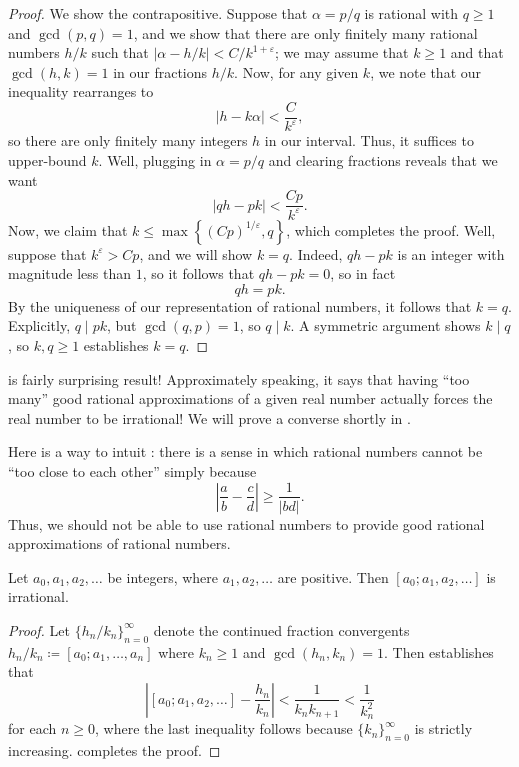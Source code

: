 \documentclass[../notes.tex]{subfiles}
\begin{document}
\begin{proof}
	We show the contrapositive. Suppose that $\alpha=p/q$ is rational with $q\ge1$ and $\gcd(p,q)=1$, and we show that there are only finitely many rational numbers $h/k$ such that $\left|\alpha-h/k\right|<C/k^{1+\varepsilon}$; we may assume that $k\ge1$ and that $\gcd(h,k)=1$ in our fractions $h/k$. Now, for any given $k$, we note that our inequality rearranges to
	\[\left|h-k\alpha\right|<\frac C{k^\varepsilon},\]
	so there are only finitely many integers $h$ in our interval. Thus, it suffices to upper-bound $k$. Well, plugging in $\alpha=p/q$ and clearing fractions reveals that we want
	\[\left|qh-pk\right|<\frac{Cp}{k^\varepsilon}.\]
	Now, we claim that $k\le\max\left\{(Cp)^{1/\varepsilon},q\right\}$, which completes the proof. Well, suppose that $k^\varepsilon>Cp$, and we will show $k=q$. Indeed, $qh-pk$ is an integer with magnitude less than $1$, so it follows that $qh-pk=0$, so in fact
	\[qh=pk.\]
	By the uniqueness of our representation of rational numbers, it follows that $k=q$. Explicitly, $q\mid pk$, but $\gcd(q,p)=1$, so $q\mid k$. A symmetric argument shows $k\mid q$, so $k,q\ge1$ establishes $k=q$.
\end{proof}
\begin{remark}
	 is fairly surprising result! Approximately speaking, it says that having ``too many'' good rational approximations of a given real number actually forces the real number to be irrational! We will prove a converse shortly in .
\end{remark}
\begin{remark}
	Here is a way to intuit : there is a sense in which rational numbers cannot be ``too close to each other'' simply because
	\[\left|\frac ab-\frac cd\right|\ge\frac1{\left|bd\right|}.\]
	Thus, we should not be able to use rational numbers to provide good rational approximations of rational numbers.
\end{remark}
\begin{corollary}
	Let $a_0,a_1,a_2,\ldots$ be integers, where $a_1,a_2,\ldots$ are positive. Then $[a_0;a_1,a_2,\ldots]$ is irrational.
\end{corollary}
\begin{proof}
	Let $\{h_n/k_n\}_{n=0}^\infty$ denote the continued fraction convergents $h_n/k_n\coloneqq[a_0;a_1,\ldots,a_n]$ where $k_n\ge1$ and $\gcd(h_n,k_n)=1$. Then  establishes that
	\[\left|[a_0;a_1,a_2,\ldots]-\frac{h_n}{k_n}\right|<\frac1{k_nk_{n+1}}<\frac1{k_n^2}\]
	for each $n\ge0$, where the last inequality follows because $\{k_n\}_{n=0}^\infty$ is strictly increasing.  completes the proof.
\end{proof}
\end{document}
